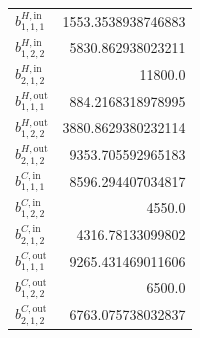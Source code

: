 \documentclass{article}%
\begin{document}
\begin{multicols*}{3}
\begin{supertabular}{lr}
	$b_{1,1,1}^{H,\text{in}}$ & 1553.3538938746883 \\%
	$b_{1,2,2}^{H,\text{in}}$ & 5830.862938023211 \\%
	$b_{2,1,2}^{H,\text{in}}$ & 11800.0 \\%
	$b_{1,1,1}^{H,\text{out}}$ & 884.2168318978995 \\%
	$b_{1,2,2}^{H,\text{out}}$ & 3880.8629380232114 \\%
	$b_{2,1,2}^{H,\text{out}}$ & 9353.705592965183 \\%
	$b_{1,1,1}^{C,\text{in}}$ & 8596.294407034817 \\%
	$b_{1,2,2}^{C,\text{in}}$ & 4550.0 \\%
	$b_{2,1,2}^{C,\text{in}}$ & 4316.78133099802 \\%
	$b_{1,1,1}^{C,\text{out}}$ & 9265.431469011606 \\%
	$b_{1,2,2}^{C,\text{out}}$ & 6500.0 \\%
	$b_{2,1,2}^{C,\text{out}}$ & 6763.075738032837 \\%
\end{supertabular}%
\end{multicols*}%
\clearpage%
\end{document}
